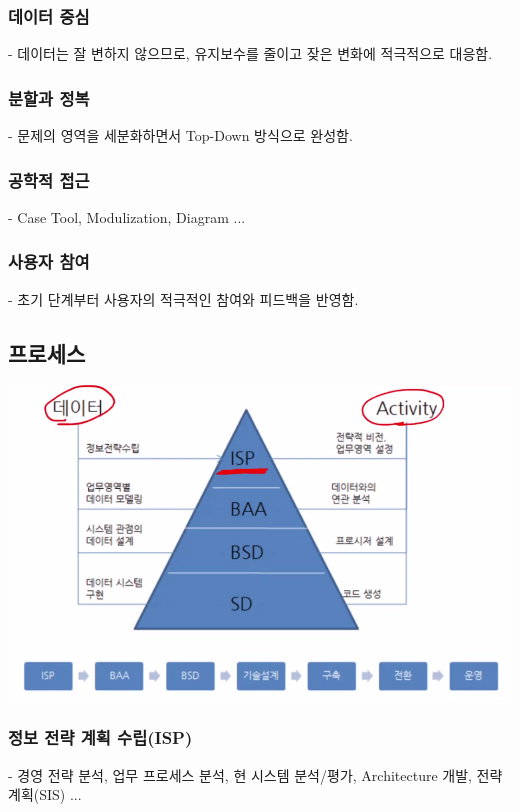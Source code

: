 \documentclass[a4paper,12pt]{article}
\begin{document}
\subsubsection{데이터 중심}
- 데이터는 잘 변하지 않으므로, 유지보수를 줄이고 잦은 변화에 적극적으로 대응함.

\subsubsection{분할과 정복}
- 문제의 영역을 세분화하면서 Top-Down 방식으로 완성함.

\subsubsection{공학적 접근}
- Case Tool, Modulization, Diagram ...

\subsubsection{사용자 참여}
- 초기 단계부터 사용자의 적극적인 참여와 피드백을 반영함.
\newline

\subsection{프로세스}

\includegraphics[scale=0.6]{22}
\newline

\subsubsection{정보 전략 계획 수립(ISP)}
- 경영 전략 분석, 업무 프로세스 분석, 현 시스템 분석/평가, Architecture 개발, 전략계획(SIS) ...
\end{document}
